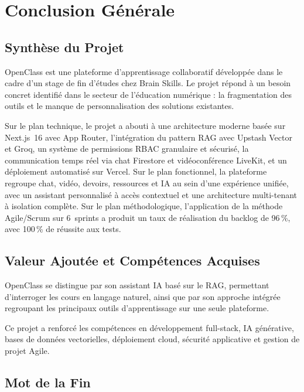 \documentclass[12pt, a4paper, twoside]{report}
\begin{document}
\chapter{Conclusion Générale}

\section{Synthèse du Projet}

OpenClass est une plateforme d'apprentissage collaboratif développée dans le cadre
d'un stage de fin d'études chez Brain Skills. Le projet répond à un besoin concret
identifié dans le secteur de l'éducation numérique : la fragmentation des outils
et le manque de personnalisation des solutions existantes.

Sur le plan technique, le projet a abouti à une architecture moderne basée sur
Next.js~16 avec App Router, l'intégration du pattern RAG avec Upstash Vector et
Groq, un système de permissions RBAC granulaire et sécurisé, la communication
temps réel via chat Firestore et vidéoconférence LiveKit, et un déploiement
automatisé sur Vercel. Sur le plan fonctionnel, la plateforme regroupe chat,
vidéo, devoirs, ressources et IA au sein d'une expérience unifiée, avec un
assistant personnalisé à accès contextuel et une architecture multi-tenant à
isolation complète. Sur le plan méthodologique, l'application de la méthode
Agile/Scrum sur 6~sprints a produit un taux de réalisation du backlog de 96\,\%,
avec 100\,\% de réussite aux tests.

\section{Valeur Ajoutée et Compétences Acquises}

OpenClass se distingue par son assistant IA basé sur le RAG, permettant d'interroger les cours en langage naturel, ainsi que par son approche intégrée regroupant les principaux outils d'apprentissage sur une seule plateforme.

Ce projet a renforcé les compétences en développement full-stack, IA générative, bases de données vectorielles, déploiement cloud, sécurité applicative et gestion de projet Agile.

\section{Mot de la Fin}
\end{document}

